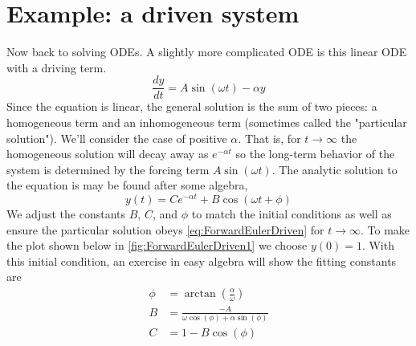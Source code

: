 \documentclass[hidelinks,notitlepage]{book}
\begin{document}
\section{Example: a driven system}
Now back to solving ODEs.  A slightly more complicated ODE is this linear ODE with a driving term.  
\begin{equation}
\label{eq:ForwardEulerDriven}
\frac{d y}{d t} = A \sin(\omega t) - \alpha y
\end{equation}
Since the equation is linear, the general solution is the sum of two pieces:  a homogeneous term and an inhomogeneous term (sometimes called the "particular solution").  We'll consider the case of positive $\alpha$.  That is, for $t \rightarrow \infty$ the homogeneous solution will decay away as $e^{-\alpha t}$ so the long-term behavior of the system is determined by the forcing term $A \sin(\omega t)$.   
The analytic solution to the equation is may be found after some algebra,
\begin{equation}
\label{eq:AnalyticDriven}
y(t) = C e^{-\alpha t} + B \cos(\omega t + \phi)
\end{equation}
We adjust the constants $B$, $C$, and $\phi$ to match the initial conditions as well as ensure the particular solution obeys 
\cref{eq:ForwardEulerDriven} for $t \rightarrow \infty$.  To make the plot shown below in \cref{fig:ForwardEulerDriven1} we choose $y(0) = 1$.  With this initial condition, an exercise in easy algebra will show the fitting constants are
\begin{align}
\nonumber
\phi &= \arctan \left( \frac{\alpha}{\omega} \right) \\
\nonumber
B &= \frac{-A}{\omega \cos(\phi) + \alpha \sin(\phi)} \\
\nonumber
C &= 1 - B \cos(\phi)
\end{align}
\end{document}
